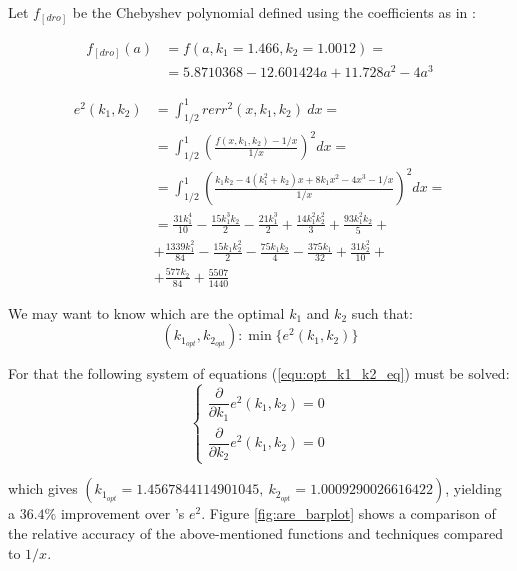 Let $f_{[dro]}$ be the Chebyshev polynomial defined using the coefficients as in \cite{drom}:

\begin{equation}\label{equ:expanded_drom_0000}
\begin{aligned}
f_{[dro]}(a) &= f(a, k_1=1.466, k_2=1.0012) = \\
&= 5.8710368 - 12.601424 a + 11.728 a^2 - 4 a^3
\end{aligned}
\end{equation}

 \begin{equation}\label{equ:equation_e_squared_k1k2}
            \begin{aligned}
            e^2(k_1, k_2) &=  \int_{1/2}^{1} rerr^2(x, k_1, k_2)\ dx = \\
            &= \int_{1/2}^{1} \left( \frac{f(x, k_1, k_2) - 1/x}{1/x} \right)^2 dx = \\
            &= \int_{1/2}^{1} \left( \frac{k_1 k_2 - 4(k_1^2 + k_2) x + 8 k_1 x^2 - 4 x^3 - 1/x}{1/x} \right)^2 dx = \\
            &= \frac{31 k_{1}^{4}}{10} - \frac{15 k_{1}^{3} k_{2}}{2} - \frac{21 k_{1}^{3}}{2} + \frac{14 k_{1}^{2} k_{2}^{2}}{3} + \frac{93 k_{1}^{2} k_{2}}{5} + \\ 
            &+ \frac{1339 k_{1}^{2}}{84} - \frac{15 k_{1} k_{2}^{2}}{2} - \frac{75 k_{1} k_{2}}{4} - \frac{375 k_{1}}{32} + \frac{31 k_{2}^{2}}{10} + \\ 
            &+ \frac{577 k_{2}}{84} + \frac{5507}{1440}
            \end{aligned}
        \end{equation}
        
We may want to know which are the optimal $k_1$ and $k_2$ such that:
\begin{equation}\label{equ:opt_k1_k2_eq}
(k_{1_{opt}}, k_{2_{opt}}): \min\{e^2(k_1, k_2)\}
\end{equation} 

For that the following system of equations (\ref{equ:opt_k1_k2_eq}) must be solved:
\begin{equation}\label{equ:opt_k1_k2_eq_partial}
\begin{cases}
\dfrac{\partial}{\partial k_1} e^2(k_1, k_2) = 0 \\
\dfrac{\partial}{\partial k_2} e^2(k_1, k_2) = 0
\end{cases}
\end{equation} 

which gives $(k_{1_{opt}} = 1.4567844114901045,\ k_{2_{opt}} = 1.0009290026616422)$, yielding a $36.4\%$ improvement over \cite{drom}'s $e^2$. Figure \ref{fig:are_barplot} shows a comparison of the relative accuracy of the above-mentioned functions and techniques compared to $1/x$.

